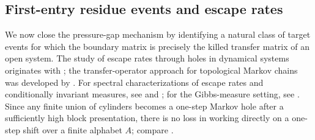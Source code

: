 \subsection{First-entry residue events and escape rates}

We now close the pressure-gap mechanism by identifying a natural class
of target events for which the boundary matrix is precisely the killed
transfer matrix of an open system.  The study of escape rates through
holes in dynamical systems originates with
\citet{PianigianiYorke1979}; the transfer-operator approach for
topological Markov chains was developed by
\citet{ColletMartinezSchmitt1997}.  For spectral characterizations of
escape rates and conditionally invariant measures, see
\citet{DemersYoung2006,DemersWrightYoung2012} and
\citet{KellerLiverani2009}; for the Gibbs-measure setting, see
\citet{FergusonPollicott2012}.  Since any finite union of cylinders
becomes a one-step Markov hole after a sufficiently high block
presentation, there is no loss in working directly on a one-step shift
over a finite alphabet \(A\); compare \citet{LindMarcus1995,Bowen2008}.

